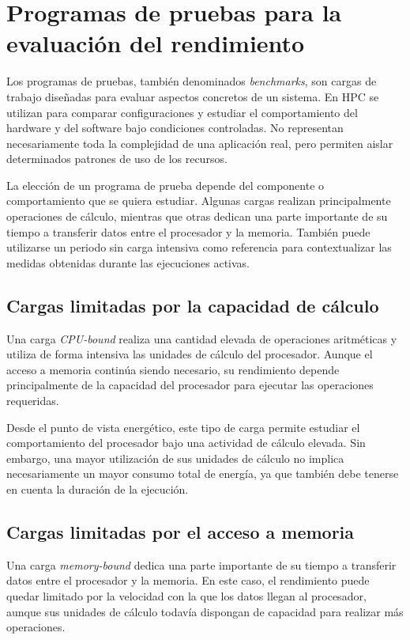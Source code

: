 \section{Programas de pruebas para la evaluación del rendimiento}

Los programas de pruebas, también denominados \emph{benchmarks}, son cargas de trabajo diseñadas para evaluar aspectos concretos de un sistema. En HPC se utilizan para comparar configuraciones y estudiar el comportamiento del hardware y del software bajo condiciones controladas. No representan necesariamente toda la complejidad de una aplicación real, pero permiten aislar determinados patrones de uso de los recursos.

La elección de un programa de prueba depende del componente o comportamiento que se quiera estudiar. Algunas cargas realizan principalmente operaciones de cálculo, mientras que otras dedican una parte importante de su tiempo a transferir datos entre el procesador y la memoria. También puede utilizarse un periodo sin carga intensiva como referencia para contextualizar las medidas obtenidas durante las ejecuciones activas.

\subsection{Cargas limitadas por la capacidad de cálculo}

Una carga \emph{CPU-bound} realiza una cantidad elevada de operaciones aritméticas y utiliza de forma intensiva las unidades de cálculo del procesador. Aunque el acceso a memoria continúa siendo necesario, su rendimiento depende principalmente de la capacidad del procesador para ejecutar las operaciones requeridas.

Desde el punto de vista energético, este tipo de carga permite estudiar el comportamiento del procesador bajo una actividad de cálculo elevada. Sin embargo, una mayor utilización de sus unidades de cálculo no implica necesariamente un mayor consumo total de energía, ya que también debe tenerse en cuenta la duración de la ejecución.

\subsection{Cargas limitadas por el acceso a memoria}

Una carga \emph{memory-bound} dedica una parte importante de su tiempo a transferir datos entre el procesador y la memoria. En este caso, el rendimiento puede quedar limitado por la velocidad con la que los datos llegan al procesador, aunque sus unidades de cálculo todavía dispongan de capacidad para realizar más operaciones.

